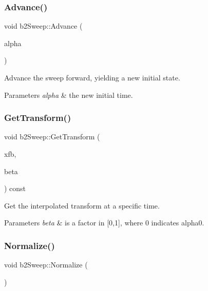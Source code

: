 \subsubsection{\texorpdfstring{Advance()}{Advance()}}
{\footnotesize\ttfamily void b2\+Sweep\+::\+Advance (\begin{DoxyParamCaption}\item[{\mbox{\hyperlink{b2_settings_8h_aacdc525d6f7bddb3ae95d5c311bd06a1}{float32}}}]{alpha }\end{DoxyParamCaption})\hspace{0.3cm}{\ttfamily [inline]}}

Advance the sweep forward, yielding a new initial state. 
\begin{DoxyParams}{Parameters}
{\em alpha} & the new initial time. \\
\hline
\end{DoxyParams}
\mbox{\label{structb2_sweep_a22ae50509de51876aefc48cd76248c61}} 
\subsubsection{\texorpdfstring{GetTransform()}{GetTransform()}}
{\footnotesize\ttfamily void b2\+Sweep\+::\+Get\+Transform (\begin{DoxyParamCaption}\item[{\mbox{\hyperlink{structb2_transform}{b2\+Transform}} $\ast$}]{xfb,  }\item[{\mbox{\hyperlink{b2_settings_8h_aacdc525d6f7bddb3ae95d5c311bd06a1}{float32}}}]{beta }\end{DoxyParamCaption}) const\hspace{0.3cm}{\ttfamily [inline]}}

Get the interpolated transform at a specific time. 
\begin{DoxyParams}{Parameters}
{\em beta} & is a factor in \mbox{[}0,1\mbox{]}, where 0 indicates alpha0. \\
\hline
\end{DoxyParams}
\mbox{\label{structb2_sweep_ad66a3086bc7656df9cf7454013a2f61b}} 
\subsubsection{\texorpdfstring{Normalize()}{Normalize()}}
{\footnotesize\ttfamily void b2\+Sweep\+::\+Normalize (\begin{DoxyParamCaption}{ }\end{DoxyParamCaption})\hspace{0.3cm}{\ttfamily [inline]}}



